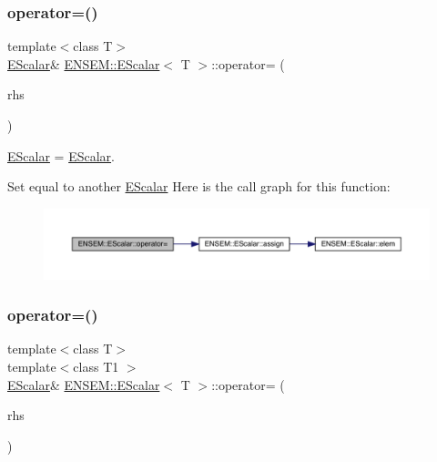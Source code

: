 \subsubsection{\texorpdfstring{operator=()}{operator=()}\hspace{0.1cm}{\footnotesize\ttfamily [9/12]}}
{\footnotesize\ttfamily template$<$class T$>$ \\
\mbox{\hyperlink{classENSEM_1_1EScalar}{E\+Scalar}}\& \mbox{\hyperlink{classENSEM_1_1EScalar}{E\+N\+S\+E\+M\+::\+E\+Scalar}}$<$ T $>$\+::operator= (\begin{DoxyParamCaption}\item[{const \mbox{\hyperlink{classENSEM_1_1EScalar}{E\+Scalar}}$<$ T $>$ \&}]{rhs }\end{DoxyParamCaption})\hspace{0.3cm}{\ttfamily [inline]}}



\mbox{\hyperlink{classENSEM_1_1EScalar}{E\+Scalar}} = \mbox{\hyperlink{classENSEM_1_1EScalar}{E\+Scalar}}. 

Set equal to another \mbox{\hyperlink{classENSEM_1_1EScalar}{E\+Scalar}} Here is the call graph for this function\+:
\nopagebreak
\begin{figure}[H]
\begin{center}
\leavevmode
\includegraphics[width=350pt]{d0/d82/classENSEM_1_1EScalar_ade0daedd37868c24651613bb6f499fd4_cgraph}
\end{center}
\end{figure}
\mbox{\label{classENSEM_1_1EScalar_a8ec804b8b082a748bb364fbb4a511757}} 
\subsubsection{\texorpdfstring{operator=()}{operator=()}\hspace{0.1cm}{\footnotesize\ttfamily [10/12]}}
{\footnotesize\ttfamily template$<$class T$>$ \\
template$<$class T1 $>$ \\
\mbox{\hyperlink{classENSEM_1_1EScalar}{E\+Scalar}}\& \mbox{\hyperlink{classENSEM_1_1EScalar}{E\+N\+S\+E\+M\+::\+E\+Scalar}}$<$ T $>$\+::operator= (\begin{DoxyParamCaption}\item[{const \mbox{\hyperlink{classENSEM_1_1EScalar}{E\+Scalar}}$<$ T1 $>$ \&}]{rhs }\end{DoxyParamCaption})\hspace{0.3cm}{\ttfamily [inline]}}




